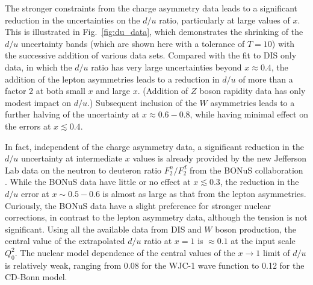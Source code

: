 \documentclass[aps,prd,amsmath,preprint]{revtex4}
\begin{document}
The stronger constraints from the charge asymmetry data leads to
a significant reduction in the uncertainties on the $d/u$ ratio,
particularly at large values of $x$.  This is illustrated in
Fig.~\ref{fig:du_data}, which demonstrates the shrinking of the
$d/u$ uncertainty bands (which are shown here with a tolerance
of $T=10$) with the successive addition of various data sets.
Compared with the fit to DIS only data, in which the $d/u$ ratio
has very large uncertainties beyond $x \approx 0.4$, the addition
of the lepton asymmetries leads to a reduction in $d/u$ of more
than a factor 2 at both small $x$ and large $x$.
(Addition of $Z$ boson rapidity data \cite{CDFZ, D0Z} has only
modest impact on $d/u$.)
Subsequent inclusion of the $W$ asymmetries leads to a further
halving of the uncertainty at $x \approx 0.6-0.8$, while having
minimal effect on the errors at $x \lesssim 0.4$.


In fact, independent of the charge asymmetry data, a significant
reduction in the $d/u$ uncertainty at intermediate $x$ values is
already provided by the new Jefferson Lab data on the neutron to
deuteron ratio $F_2^n/F_2^d$ from the BONuS collaboration
\cite{BONuS}.  While the BONuS data have little or no effect
at $x \lesssim 0.3$, the reduction in the $d/u$ error at
$x \sim 0.5-0.6$ is almost as large as that from the lepton
asymmetries.
%
Curiously, the BONuS data have a slight preference for stronger
nuclear corrections, in contrast to the lepton asymmetry data,
although the tension is not significant.
%
Using all the available data from DIS and $W$ boson production,
the central value of the extrapolated $d/u$ ratio at $x=1$
is $\approx 0.1$ at the input scale $Q_0^2$.
The nuclear model dependence of the central values of the
$x \to 1$ limit of $d/u$ is relatively weak, ranging from 0.08
for the WJC-1 wave function to 0.12 for the CD-Bonn model.
\end{document}
